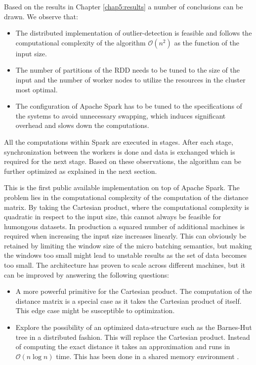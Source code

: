 Based on the results in Chapter \ref{chap5:results} a number of conclusions can be drawn. We observe that:
\begin{itemize} 
    \item The distributed implementation of outlier-detection is feasible and follows the computational complexity of the algorithm $\mathcal{O}(n^{2})$ as the function of the input size.
    \item The number of partitions of the RDD needs to be tuned to the size of the input and the number of worker nodes to utilize the resources in the cluster most optimal.
    \item The configuration of Apache Spark has to be tuned to the specifications of the systems to avoid unnecessary swapping, which induces significant overhead and slows down the computations.
\end{itemize}

All the computations within Spark are executed in stages. After each stage, synchronization between the workers is done and data is exchanged which is required for the next stage. Based on these observations, the algorithm can be further optimized as explained in the next section.

This is the first public available implementation on top of Apache Spark. The problem lies in the computational complexity of the computation of the distance matrix. By taking the Cartesian product, where the computational complexity is quadratic in respect to the input size, this cannot always be feasible for humongous datasets. In production a squared number of additional machines is required when increasing the input size increases linearly. This can obviously be retained by limiting the window size of the micro batching semantics, but making the windows too small might lead to unstable results as the set of data becomes too small. The architecture has proven to scale across different machines, but it can be improved by answering the following questions:
\begin{itemize}
    \item A more powerful primitive for the Cartesian product. The computation of the distance matrix is a special case as it takes the Cartesian product of itself. This edge case might be susceptible to optimization.
    \item Explore the possibility of an optimized data-structure such as the Barnes-Hut tree \cite{Barnes1986} in a distributed fashion. This will replace the Cartesian product. Instead of computing the exact distance it takes an approximation and runs in $\mathcal{O}(n \log n)$ time. This has been done in a shared memory environment \cite{Dubinski1996132}.
\end{itemize}
